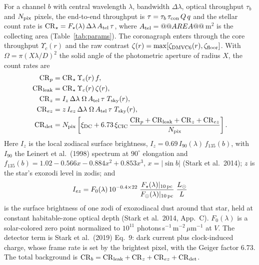 \documentclass[11pt,a4paper]{article}
\begin{document}
For a channel $b$ with central wavelength $\lambda$, bandwidth $\Delta\lambda$, optical throughput
$\tau_b$ and $N_{\rm pix}$ pixels, the end-to-end throughput is
$\tau = \tau_b\,\tau_{\rm con}\,Q\,q$ and the stellar count rate is
$\mathrm{CR}_\star = F_\star(\lambda)\,\Delta\lambda\,A_{\rm tel}\,\tau$, where
$A_{\rm tel} = @@AREA@@$\,m$^2$ is the collecting area (Table~\ref{tab:params}). The coronagraph
enters through the core throughput $\Upsilon_c(r)$ and the raw contrast
$\zeta(r) = \max[\zeta_{\rm DMVC6}(r), \zeta_{\rm floor}]$. With
$\Omega = \pi(X\lambda/D)^2$ the solid angle of the photometric aperture of radius $X$, the
count rates are
\begin{align}
\mathrm{CR}_p &= \mathrm{CR}_\star\,\Upsilon_c(r)\,f, \label{eq:crp}\\
\mathrm{CR}_{\rm leak} &= \mathrm{CR}_\star\,\Upsilon_c(r)\,\zeta(r), \label{eq:crleak}\\
\mathrm{CR}_z &= I_z\,\Delta\lambda\;\Omega\,A_{\rm tel}\,\tau\;T_{\rm sky}(r), \label{eq:crz}\\
\mathrm{CR}_{ez} &= z\,I_{ez}\,\Delta\lambda\;\Omega\,A_{\rm tel}\,\tau\;T_{\rm sky}(r),
\label{eq:crez}\\
\mathrm{CR}_{\rm det} &= N_{\rm pix}\left[\xi_{\rm DC} + 6.73\,\xi_{\rm CIC}\,
\frac{\mathrm{CR}_p + \mathrm{CR}_{\rm leak} + \mathrm{CR}_z + \mathrm{CR}_{ez}}{N_{\rm pix}}
\right]. \label{eq:crdet}
\end{align}
Here $I_z$ is the local zodiacal surface brightness,
$I_z = 0.69\,I_{90}(\lambda)\,f_{135}(b)$, with $I_{90}$ the Leinert et al.\ (1998) spectrum at
$90^\circ$ elongation and $f_{135}(b) = 1.02 - 0.566x - 0.884x^2 + 0.853x^3$, $x = |\sin b|$
(Stark et al.\ 2014); $z$ is the star's exozodi level in zodis; and
\begin{equation}
I_{ez} = F_0(\lambda)\,10^{-0.4\times 22}\;
\frac{F_\star(\lambda)|_{10\,{\rm pc}}}{F_\odot(\lambda)|_{10\,{\rm pc}}}\;\frac{L_\odot}{L}
\label{eq:iez}
\end{equation}
is the surface brightness of one zodi of exozodiacal dust around that star, held at constant
habitable-zone optical depth (Stark et al.\ 2014, App.~C). $F_0(\lambda)$ is a solar-colored
zero point normalized to $10^{11}$ photons\,s$^{-1}$\,m$^{-2}$\,$\mu$m$^{-1}$ at $V$. The
detector term is Stark et al.\ (2019) Eq.~9: dark current plus clock-induced charge, whose frame
rate is set by the brightest pixel, with the Geiger factor 6.73. The total background is
$\mathrm{CR}_b = \mathrm{CR}_{\rm leak} + \mathrm{CR}_z + \mathrm{CR}_{ez} + \mathrm{CR}_{\rm det}$.
\end{document}
